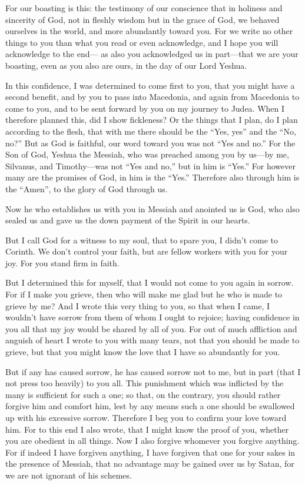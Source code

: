 \myverse{}For our boasting is this: the testimony of our conscience that
in holiness and sincerity of God, not in fleshly wisdom but in the grace of God, we behaved ourselves
in the world, and more abundantly toward you.
\myverse{}For we write no other things to you than what you read or even acknowledge,
and I hope you will acknowledge to the end—
\myverse{}as also you acknowledged us in part—that we are your boasting, even as you
also are ours, in the day of our Lord Yeshua.

\myverse{}In this confidence, I was determined to come first to you, that
you might have a second benefit,
\myverse{}and by you to pass into Macedonia, and again from Macedonia to come to you,
and to be sent forward by you on my journey to Judea.
\myverse{}When I therefore planned this, did I show fickleness? Or the things that I
plan, do I plan according to the flesh, that with me there should be the “Yes, yes” and the “No, no?”
\myverse{}But as God is faithful, our word toward you was not “Yes and no.”
\myverse{}For the Son of God, Yeshua the Messiah, who was preached among you by us—by
me, Silvanus, and Timothy—was not “Yes and no,” but in him is “Yes.”
\myverse{}For however many are the promises of God, in him is the “Yes.” Therefore also
through him is the “Amen”, to the glory of God through us.

\myverse{}Now he who establishes us with you in Messiah and anointed us
is God,
\myverse{}who also sealed us and gave us the down payment of the Spirit in our hearts.

\myverse{}But I call God for a witness to my soul, that to spare you, I
didn’t come to Corinth.
\myverse{}We don’t control your faith, but are fellow workers with you for your joy.
For you stand firm in faith.


\mychapter{} \myverse*{}But I determined this for myself, that I would not come to you
again in sorrow.
\myverse{}For if I make you grieve, then who will make me glad but he who is made to grieve
by me?
\myverse{}And I wrote this very thing to you, so that when I came, I wouldn’t have sorrow
from them of whom I ought to rejoice; having confidence in you all that my joy would be shared by all
of you.
\myverse{}For out of much affliction and anguish of heart I wrote to you with many tears,
not that you should be made to grieve, but that you might know the love that I have so abundantly for
you.

\myverse{}But if any has caused sorrow, he has caused sorrow not to me, but
in part (that I not press too heavily) to you all.
\myverse{}This punishment which was inflicted by the many is sufficient for such a one;
\myverse{}so that, on the contrary, you should rather forgive him and comfort him, lest
by any means such a one should be swallowed up with his excessive sorrow.
\myverse{}Therefore I beg you to confirm your love toward him.
\myverse{}For to this end I also wrote, that I might know the proof of you, whether you
are obedient in all things.
\myverse{}Now I also forgive whomever you forgive anything. For if indeed I have forgiven
anything, I have forgiven that one for your sakes in the presence of Messiah,
\myverse{}that no advantage may be gained over us by Satan, for we are not ignorant
of his schemes.

